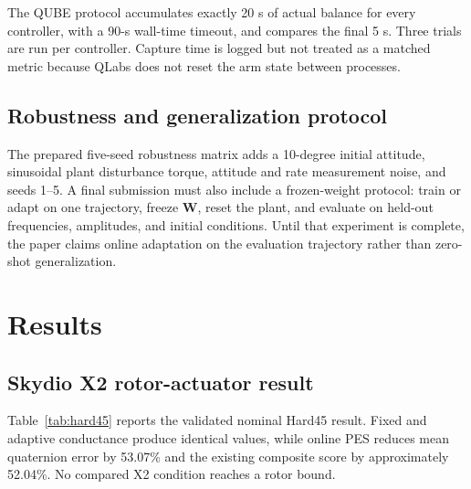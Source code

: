 \documentclass[10pt,twocolumn]{article}
\begin{document}
The QUBE protocol accumulates exactly 20 s of actual balance for every
controller, with a 90-s wall-time timeout, and compares the final 5 s. Three
trials are run per controller. Capture time is logged but not treated as a
matched metric because QLabs does not reset the arm state between processes.

\subsection{Robustness and generalization protocol}

The prepared five-seed robustness matrix adds a 10-degree initial attitude,
sinusoidal plant disturbance torque, attitude and rate measurement noise, and
seeds 1--5. A final submission must also include a frozen-weight protocol:
train or adapt on one trajectory, freeze $\bm W$, reset the plant, and evaluate
on held-out frequencies, amplitudes, and initial conditions. Until that
experiment is complete, the paper claims online adaptation on the evaluation
trajectory rather than zero-shot generalization.

\section{Results}

\subsection{Skydio X2 rotor-actuator result}

Table~\ref{tab:hard45} reports the validated nominal Hard45 result. Fixed and
adaptive conductance produce identical values, while online PES reduces mean
quaternion error by 53.07\% and the existing composite score by approximately
52.04\%. No compared X2 condition reaches a rotor bound.
\end{document}
